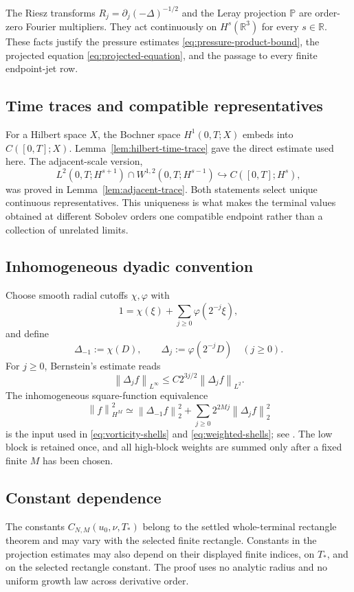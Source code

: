 \documentclass[11pt,letterpaper]{article}
\theoremstyle{definition}
\theoremstyle{remark}
\newcommand{\R}{\mathbb R}
\newcommand{\norm}[1]{\left\lVert #1\right\rVert}
\begin{document}
The Riesz transforms \(R_j=\partial_j(-\Delta)^{-1/2}\) and the Leray
projection \(\mathbb P\) are order-zero Fourier multipliers.  They act
continuously on \(H^s(\R^3)\) for every \(s\in\R\).  These facts justify
the pressure estimates \eqref{eq:pressure-product-bound}, the projected
equation \eqref{eq:projected-equation}, and the passage to every finite
endpoint-jet row.

\subsection{Time traces and compatible representatives}

For a Hilbert space \(X\), the Bochner space \(H^1(0,T;X)\) embeds into
\(C([0,T];X)\).  Lemma~\ref{lem:hilbert-time-trace} gave the direct
estimate used here.  The adjacent-scale version,
\[
L^2(0,T;H^{s+1})\cap
W^{1,2}(0,T;H^{s-1})
\hookrightarrow C([0,T];H^s),
\]
was proved in Lemma~\ref{lem:adjacent-trace}.  Both statements select unique
continuous representatives.  This uniqueness is what makes the terminal
values obtained at different Sobolev orders one compatible endpoint rather
than a collection of unrelated limits.

\subsection{Inhomogeneous dyadic convention}

Choose smooth radial cutoffs \(\chi,\varphi\) with
\[
1=\chi(\xi)+\sum_{j\ge0}\varphi(2^{-j}\xi),
\]
and define
\[
\Delta_{-1}:=\chi(D),
\qquad
\Delta_j:=\varphi(2^{-j}D)\quad(j\ge0).
\]
For \(j\ge0\), Bernstein's estimate reads
\[
\norm{\Delta_j f}_{L^\infty}
\le C2^{3j/2}\norm{\Delta_j f}_{L^2}.
\]
The inhomogeneous square-function equivalence
\[
\norm{f}_{H^M}^2
\simeq
\norm{\Delta_{-1}f}_2^2
+\sum_{j\ge0}2^{2Mj}\norm{\Delta_jf}_2^2
\]
is the input used in \eqref{eq:vorticity-shells} and
\eqref{eq:weighted-shells}; see
\cite{BahouriCheminDanchin2011}.  The low block is retained once, and all
high-block weights are summed only after a fixed finite \(M\) has been
chosen.

\subsection{Constant dependence}

The constants \(C_{N,M}(u_0,\nu,T_*)\) belong to the settled
whole-terminal rectangle theorem and may vary with the selected finite
rectangle.  Constants in the projection estimates may also depend on their
displayed finite indices, on \(T_*\), and on the selected rectangle
constant.  The proof uses no analytic radius and no uniform growth law
across derivative order.
\end{document}

